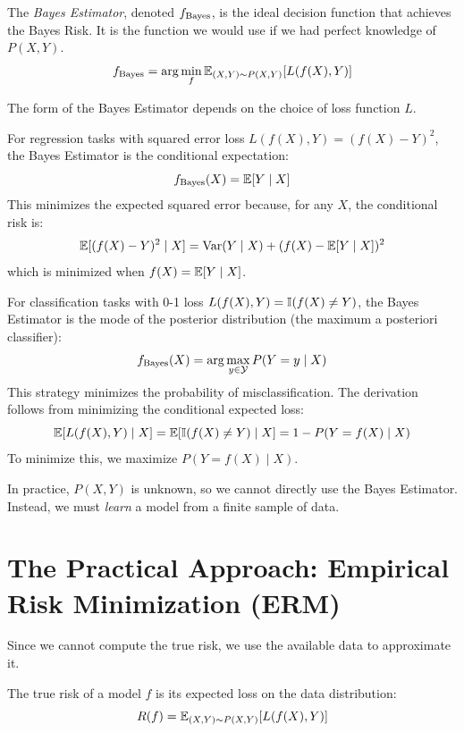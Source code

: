 \begin{notechapter}
\begin{definition}
    The \emph{Bayes Estimator}, denoted \(f_{\text{Bayes}}\), is the ideal decision function that achieves the Bayes Risk. It is the function we would use if we had perfect knowledge of \( P(X, Y) \).
    \[
    f_{\text{Bayes}} = \arg\min_{f} \mathbb{E}_{(X,Y)\sim P(X,Y)}[L(f(X), Y)]
    \]
\end{definition}

The form of the Bayes Estimator depends on the choice of loss function \( L \).

\begin{example}
    For regression tasks with squared error loss \( L(f(X),Y)=(f(X)-Y)^{2} \), the Bayes Estimator is the conditional expectation:
    \[
    f_{\text{Bayes}}(X) = \mathbb{E}[Y \mid X]
    \]
    This minimizes the expected squared error because, for any \( X \), the conditional risk is:
    \[
    \mathbb{E}[(f(X)-Y)^{2} \mid X] = \text{Var}(Y \mid X) + (f(X)-\mathbb{E}[Y \mid X])^{2}
    \]
    which is minimized when \( f(X) = \mathbb{E}[Y \mid X] \).
\end{example}

\begin{example}
    For classification tasks with 0-1 loss \( L(f(X),Y)=\mathbb{I}(f(X)\neq Y) \), the Bayes Estimator is the mode of the posterior distribution (the maximum a posteriori classifier):
    \[
    f_{\text{Bayes}}(X) = \arg\max_{y \in \mathcal{Y}} P(Y=y \mid X)
    \]
    This strategy minimizes the probability of misclassification. The derivation follows from minimizing the conditional expected loss:
    \[
    \mathbb{E}[L(f(X),Y) \mid X] = \mathbb{E}[\mathbb{I}(f(X)\neq Y) \mid X] = 1 - P(Y=f(X) \mid X)
    \]
    To minimize this, we maximize \( P(Y=f(X) \mid X) \).
\end{example}

In practice, \( P(X, Y) \) is unknown, so we cannot directly use the Bayes Estimator. Instead, we must \emph{learn} a model from a finite sample of data.

\section{The Practical Approach: Empirical Risk Minimization (ERM)}
\label{generalization-risk:sec:erm}

Since we cannot compute the true risk, we use the available data to approximate it.

\begin{definition}
    The true risk of a model \( f \) is its expected loss on the data distribution:
    \[
    R(f) = \mathbb{E}_{(X,Y)\sim P(X,Y)}[L(f(X), Y)]
    \]
\end{definition}


\end{notechapter}
